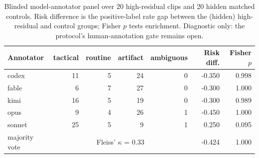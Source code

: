 \begin{table}[t]
  \centering
  \small
  \begin{tabular}{lrrrrrr}
    \toprule
    Annotator & tactical & routine & artifact & ambiguous & Risk diff. & Fisher $p$ \\
    \midrule
    codex & 11 & 5 & 24 & 0 & -0.350 & 0.998 \\
    fable & 6 & 7 & 27 & 0 & -0.300 & 1.000 \\
    kimi & 16 & 5 & 19 & 0 & -0.300 & 0.989 \\
    opus & 9 & 4 & 26 & 1 & -0.450 & 1.000 \\
    sonnet & 25 & 5 & 9 & 1 & 0.250 & 0.095 \\
    \midrule
    majority vote & \multicolumn{4}{c}{Fleiss' $\kappa$ = 0.33} & -0.424 & 1.000 \\
    \bottomrule
  \end{tabular}
  \caption{Blinded model-annotator panel over 20 high-residual clips and 20 hidden matched controls. Risk difference is the positive-label rate gap between the (hidden) high-residual and control groups; Fisher $p$ tests enrichment. Diagnostic only: the protocol's human-annotation gate remains open.}
  \label{tab:panel}
\end{table}
